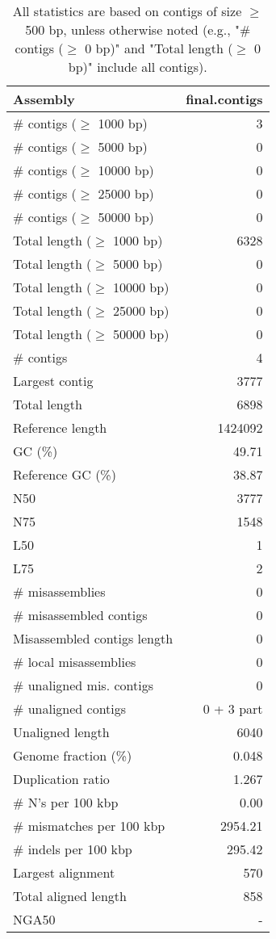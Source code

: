 \documentclass[12pt,a4paper]{article}
\begin{document}
\begin{table}[ht]
\begin{center}
\caption{All statistics are based on contigs of size $\geq$ 500 bp, unless otherwise noted (e.g., "\# contigs ($\geq$ 0 bp)" and "Total length ($\geq$ 0 bp)" include all contigs).}
\begin{tabular}{|l*{1}{|r}|}
\hline
Assembly & final.contigs \\ \hline
\# contigs ($\geq$ 1000 bp) & 3 \\ \hline
\# contigs ($\geq$ 5000 bp) & 0 \\ \hline
\# contigs ($\geq$ 10000 bp) & 0 \\ \hline
\# contigs ($\geq$ 25000 bp) & 0 \\ \hline
\# contigs ($\geq$ 50000 bp) & 0 \\ \hline
Total length ($\geq$ 1000 bp) & 6328 \\ \hline
Total length ($\geq$ 5000 bp) & 0 \\ \hline
Total length ($\geq$ 10000 bp) & 0 \\ \hline
Total length ($\geq$ 25000 bp) & 0 \\ \hline
Total length ($\geq$ 50000 bp) & 0 \\ \hline
\# contigs & 4 \\ \hline
Largest contig & 3777 \\ \hline
Total length & 6898 \\ \hline
Reference length & 1424092 \\ \hline
GC (\%) & 49.71 \\ \hline
Reference GC (\%) & 38.87 \\ \hline
N50 & 3777 \\ \hline
N75 & 1548 \\ \hline
L50 & 1 \\ \hline
L75 & 2 \\ \hline
\# misassemblies & 0 \\ \hline
\# misassembled contigs & 0 \\ \hline
Misassembled contigs length & 0 \\ \hline
\# local misassemblies & 0 \\ \hline
\# unaligned mis. contigs & 0 \\ \hline
\# unaligned contigs & 0 + 3 part \\ \hline
Unaligned length & 6040 \\ \hline
Genome fraction (\%) & 0.048 \\ \hline
Duplication ratio & 1.267 \\ \hline
\# N's per 100 kbp & 0.00 \\ \hline
\# mismatches per 100 kbp & 2954.21 \\ \hline
\# indels per 100 kbp & 295.42 \\ \hline
Largest alignment & 570 \\ \hline
Total aligned length & 858 \\ \hline
NGA50 & - \\ \hline
\end{tabular}
\end{center}
\end{table}
\end{document}
